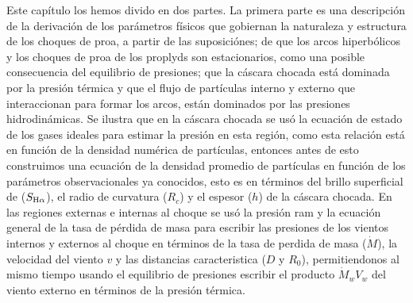 % 



% 


\label{chap:theori}

Este capítulo los hemos divido en dos partes. La primera parte es una descripción de la derivación de los parámetros físicos que gobiernan la naturaleza y estructura de los choques de proa, a partir de las suposiciónes; de que los arcos hiperbólicos y los choques de proa de los proplyds son estacionarios, como una posible consecuencia del equilibrio de presiones; que la cáscara chocada está dominada por la presión térmica y que el flujo de partículas  interno y externo que interaccionan para formar los arcos, están dominados por las presiones hidrodinámicas. Se ilustra que en la cáscara chocada se usó la ecuación de estado de los gases ideales para estimar la presión en esta región, como esta relación está en función de la densidad numérica de partículas, entonces antes de esto construimos una ecuación de la densidad promedio de partículas en función de los parámetros observacionales ya conocidos, esto es en términos del brillo superficial de \ha{} (\(S_{\mathrm{H}\alpha{}}\)), el radio de curvatura (\(R_{c}\)) y el espesor (\(h\)) de la cáscara chocada. En las regiones externas e internas al choque se usó la presión ram y la ecuación general de la tasa de pérdida de masa para escribir las  presiones de los vientos internos y externos al choque en términos de la tasa de perdida de masa (\(\dot{M}\)), la velocidad del viento \(v\) y las distancias caracteristica (\(D\) y \(R_{0}\)), permitiendonos al mismo tiempo usando el equilibrio de presiones escribir el producto \(\dot{M}_{w}V_{w}\) del viento externo en términos de la presión térmica.\\

